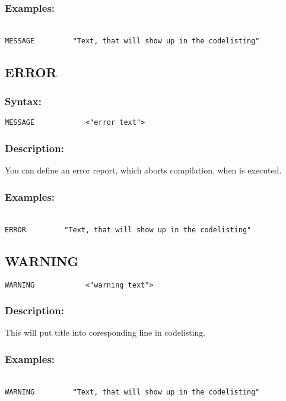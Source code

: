         \subsubsection{Examples:}
            {
                ~\\
                \usecodefont
                \verb'MESSAGE         "Text, that will show up in the codelisting"'
            }

    \subsection{ERROR}
        \subsubsection{Syntax:}
            \verb'MESSAGE            <"error text">'
            
        \subsubsection{Description:}
        You can define an error report, which aborts compilation, when is executed.
        
        \subsubsection{Examples:}
            {
                ~\\
                \usecodefont
                \verb'ERROR         "Text, that will show up in the codelisting"'
            }

    \subsection{WARNING}
            \verb'WARNING            <"warning text">'
            
        \subsubsection{Description:}
            This will put title into coresponding line in codelisting.
            
        \subsubsection{Examples:}
            {
                ~\\
                \usecodefont
                \verb'WARNING         "Text, that will show up in the codelisting"'
            }


